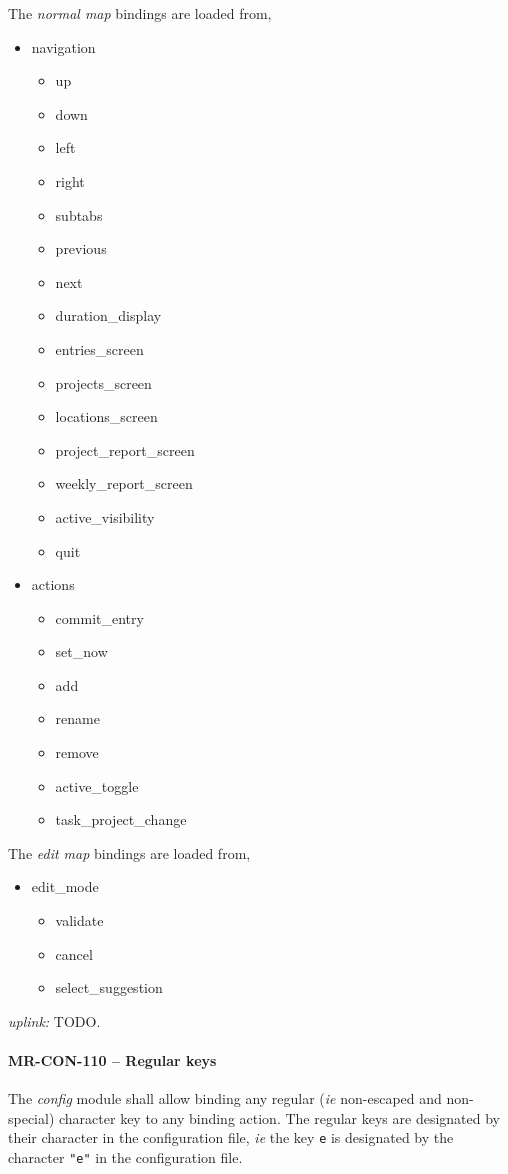 The \emph{normal map} bindings are loaded from,
\begin{itemize}
\item navigation
  \begin{itemize}
  \item up
  \item down
  \item left
  \item right
  \item subtabs
  \item previous
  \item next
  \item duration\_display
  \item entries\_screen
  \item projects\_screen
  \item locations\_screen
  \item project\_report\_screen
  \item weekly\_report\_screen
  \item active\_visibility
  \item quit
  \end{itemize}
\item actions
  \begin{itemize}
  \item commit\_entry
  \item set\_now
  \item add
  \item rename
  \item remove
  \item active\_toggle
  \item task\_project\_change
  \end{itemize}
\end{itemize}

The \emph{edit map} bindings are loaded from,
\begin{itemize}
\item edit\_mode
  \begin{itemize}
  \item validate
  \item cancel
  \item select\_suggestion
  \end{itemize}
\end{itemize}

\textit{uplink: } TODO.

\paragraph{MR-CON-110 -- Regular keys}
The \emph{config} module shall allow binding any regular (\textit{ie}
non-escaped and non-special) character key to any binding action.
The regular keys are designated by their character in the configuration
file, \textit{ie} the key \lstinline{e} is designated by the character
\lstinline{"e"} in the configuration file.

